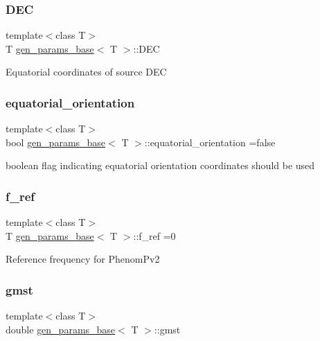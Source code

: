 \subsubsection{\texorpdfstring{D\+EC}{DEC}}
{\footnotesize\ttfamily template$<$class T$>$ \\
T \hyperlink{classgen__params__base}{gen\+\_\+params\+\_\+base}$<$ T $>$\+::D\+EC}

Equatorial coordinates of source D\+EC \mbox{\label{classgen__params__base_a769d637405f8456595b513305f91d0ca}} 
\subsubsection{\texorpdfstring{equatorial\+\_\+orientation}{equatorial\_orientation}}
{\footnotesize\ttfamily template$<$class T$>$ \\
bool \hyperlink{classgen__params__base}{gen\+\_\+params\+\_\+base}$<$ T $>$\+::equatorial\+\_\+orientation =false}

boolean flag indicating equatorial orientation coordinates should be used \mbox{\label{classgen__params__base_a8aafd6ccd8331c201bc0f301898d5606}} 
\subsubsection{\texorpdfstring{f\+\_\+ref}{f\_ref}}
{\footnotesize\ttfamily template$<$class T$>$ \\
T \hyperlink{classgen__params__base}{gen\+\_\+params\+\_\+base}$<$ T $>$\+::f\+\_\+ref =0}

Reference frequency for Phenom\+Pv2 \mbox{\label{classgen__params__base_a9cf0459a975c748e8fa828b8af093611}} 
\subsubsection{\texorpdfstring{gmst}{gmst}}
{\footnotesize\ttfamily template$<$class T$>$ \\
double \hyperlink{classgen__params__base}{gen\+\_\+params\+\_\+base}$<$ T $>$\+::gmst}

